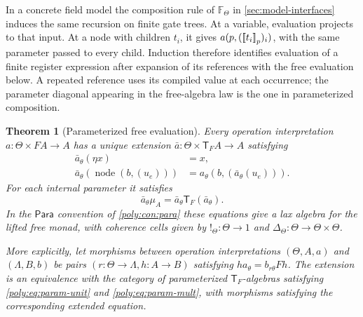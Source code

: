 \documentclass[11pt,a4paper]{article}
\newtheorem{theorem}{Theorem}[section]
\theoremstyle{definition}
\theoremstyle{remark}\newaliascnt{remark}{theorem}
\providecommand{\llbracket}{\mathopen{[\mkern-3mu[}}
\providecommand{\rrbracket}{\mathclose{]\mkern-3mu]}}
\newcommand{\para}{\mathsf{Para}}
\numberwithin{equation}{section}
\begin{document}
In a concrete field model the composition rule of \(\mathbb F_\Theta\) in \cref{sec:model-interfaces} induces the same recursion on finite gate trees. At a variable, evaluation projects to that input. At a node with children \(t_i\), it gives \(a(p,(\llbracket t_i\rrbracket_p)_i)\), with the same parameter passed to every child. Induction therefore identifies evaluation of a finite register expression after expansion of its references with the free evaluation below. A repeated reference uses its compiled value at each occurrence; the parameter diagonal appearing in the free-algebra law is the one in parameterized composition.

\begin{theorem}[Parameterized free evaluation]
\label{poly:thm:parametric}
Every operation interpretation $a:\Theta\times FA\to A$ has a
unique extension $\bar a:\Theta\times\mathsf T_FA\to A$ satisfying
\begin{align}
 \bar a_\theta(\eta x)&=x,\label{poly:eq:param-unit}\\
 \bar a_\theta(\operatorname{node}(b,(u_e)))
   &=a_\theta(b,(\bar a_\theta(u_e))).\label{poly:eq:param-node}
\end{align}
For each internal parameter it satisfies
\begin{equation}\label{poly:eq:param-mult}
 \bar a_\theta\mu_A
       =\bar a_\theta\mathsf T_F(\bar a_\theta).
\end{equation}
In the $\para$ convention of \cref{poly:con:para} these equations give a lax algebra for the lifted free
monad, with coherence cells given by
$!_\Theta:\Theta\to1$ and
$\Delta_\Theta:\Theta\to\Theta\times\Theta$.

More explicitly, let morphisms between operation interpretations
$(\Theta,A,a)$ and $(\Lambda,B,b)$ be pairs
$(r:\Theta\to\Lambda,h:A\to B)$ satisfying
$h a_\theta=b_{r\theta}Fh$. The extension is an equivalence with
the category of parameterized $\mathsf T_F$-algebras satisfying
\eqref{poly:eq:param-unit} and \eqref{poly:eq:param-mult}, with
morphisms satisfying the corresponding extended equation.
\end{theorem}
\end{document}
